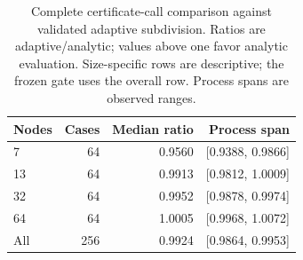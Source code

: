 \begin{table}[!htbp]
\centering
\caption{Complete certificate-call comparison against validated adaptive subdivision. Ratios are adaptive/analytic; values above one favor analytic evaluation. Size-specific rows are descriptive; the frozen gate uses the overall row. Process spans are observed ranges.}
\label{tab:windowtimes}
\begin{tabular}{lrrr}\toprule
Nodes & Cases & Median ratio & Process span\\\midrule
7 & 64 & 0.9560 & [0.9388, 0.9866]\\
13 & 64 & 0.9913 & [0.9812, 1.0009]\\
32 & 64 & 0.9952 & [0.9878, 0.9974]\\
64 & 64 & 1.0005 & [0.9968, 1.0072]\\
All & 256 & 0.9924 & [0.9864, 0.9953]\\
\bottomrule\end{tabular}
\end{table}
